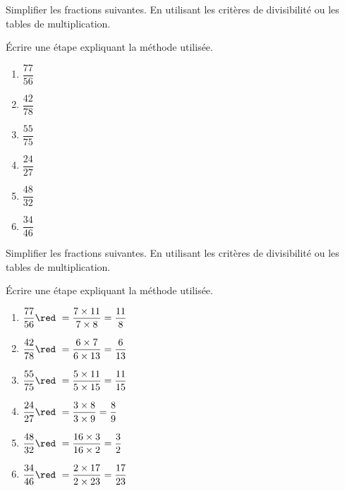 \begin{exercice*}
    Simplifier les fractions suivantes. En utilisant les critères de divisibilité ou les tables de multiplication.

    Écrire une étape expliquant la méthode utilisée.
    \begin{spacing}{1.5}
        \begin{multicols}{3}
            \begin{enumerate}
                \item $\dfrac{77}{56}$
                \item $\dfrac{42}{78}$
                \item $\dfrac{55}{75}$
                \item $\dfrac{24}{27}$
                \item $\dfrac{48}{32}$
                \item $\dfrac{34}{46}$
            \end{enumerate}            
        \end{multicols}        
    \end{spacing}
\end{exercice*}
\begin{corrige}
    Simplifier les fractions suivantes. En utilisant les critères de divisibilité ou les tables de multiplication.

    Écrire une étape expliquant la méthode utilisée.
    \begin{spacing}{1.5}
        \begin{multicols}{2}
            \begin{enumerate}
                \item $\dfrac{77}{56} {\red ~= \dfrac{7\times11}{7\times8} = \dfrac{11}{8}  }$
                \item $\dfrac{42}{78} {\red ~= \dfrac{6\times7}{6\times13} = \dfrac{6}{13}  }$
                \item $\dfrac{55}{75} {\red ~= \dfrac{5\times11}{5\times15} = \dfrac{11}{15}}$
                \item $\dfrac{24}{27} {\red ~= \dfrac{3\times8}{3\times9} = \dfrac{8}{9}    }$
                \item $\dfrac{48}{32} {\red ~= \dfrac{16\times3}{16\times2} = \dfrac{3}{2}  }$
                \item $\dfrac{34}{46} {\red ~= \dfrac{2\times17}{2\times23} = \dfrac{17}{23}}$
            \end{enumerate}            
        \end{multicols}        
    \end{spacing}

\end{corrige}

